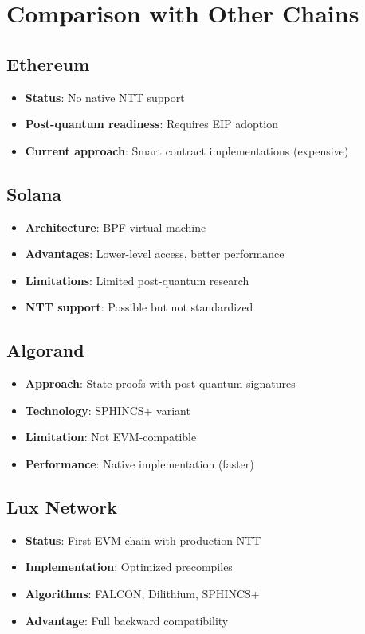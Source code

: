 \section{Comparison with Other Chains}


\subsection{Ethereum}

\begin{itemize}
\item \textbf{Status}: No native NTT support
\item \textbf{Post-quantum readiness}: Requires EIP adoption
\item \textbf{Current approach}: Smart contract implementations (expensive)
\end{itemize}

\subsection{Solana}

\begin{itemize}
\item \textbf{Architecture}: BPF virtual machine
\item \textbf{Advantages}: Lower-level access, better performance
\item \textbf{Limitations}: Limited post-quantum research
\item \textbf{NTT support}: Possible but not standardized
\end{itemize}

\subsection{Algorand}

\begin{itemize}
\item \textbf{Approach}: State proofs with post-quantum signatures
\item \textbf{Technology}: SPHINCS+ variant
\item \textbf{Limitation}: Not EVM-compatible
\item \textbf{Performance}: Native implementation (faster)
\end{itemize}

\subsection{Lux Network}

\begin{itemize}
\item \textbf{Status}: First EVM chain with production NTT
\item \textbf{Implementation}: Optimized precompiles
\item \textbf{Algorithms}: FALCON, Dilithium, SPHINCS+
\item \textbf{Advantage}: Full backward compatibility
\end{itemize}


